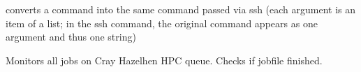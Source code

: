 \documentclass[letterpaper,10pt,english]{sphinxmanual}
\begin{document}
\begin{fulllineitems}
\begin{fulllineitems}
\end{fulllineitems}


\begin{fulllineitems}
\label{\detokenize{machine:machine.cray.Cray.to_ssh}}
converts a command into the same command passed via ssh
(each argument is an item of a list; in the ssh command, 
the original command appears as one argument and thus one 
string)

\end{fulllineitems}


\begin{fulllineitems}
\label{\detokenize{machine:machine.cray.Cray.wait_finished}}
Monitors all jobs on Cray Hazelhen HPC queue. 
Checks if jobfile finished.

\end{fulllineitems}


\end{fulllineitems}

\end{document}
